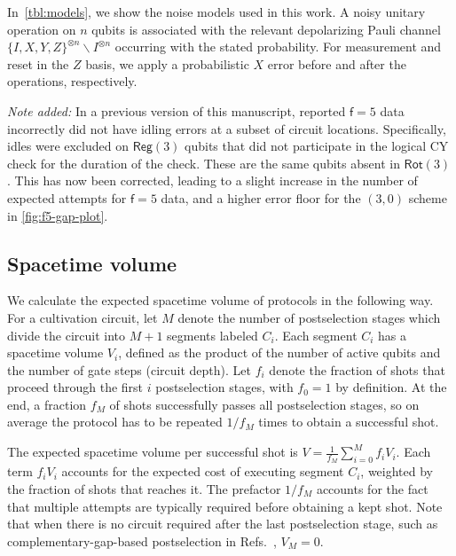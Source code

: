 \documentclass[%
    aps, 
    physrev,
    reprint,
]{revtex4-2}
\newcommand{\fd}[1]{\mathsf{f}=#1}
\newcommand{\rot}[1]{\mathsf{Rot}(#1)}
\newcommand{\reg}[1]{\mathsf{Reg}(#1)}
\begin{document}
In~\cref{tbl:models}, we show the noise models used in this work. 
A noisy unitary operation on $n$ qubits is associated with the relevant depolarizing Pauli channel $\{I,X,Y,Z\}^{\otimes n} \backslash I^{\otimes n}$ occurring with the stated probability. 
For measurement and reset in the $Z$ basis, we apply a probabilistic $X$ error before and after the operations, respectively.

\textit{Note added:} In a previous version of this manuscript, reported $\fd{5}$ data incorrectly did not have idling errors at a subset of circuit locations. Specifically, idles were excluded on $\reg{3}$ qubits that did not participate in the logical CY check for the duration of the check. These are the same qubits absent in $\rot{3}$. This has now been corrected, leading to a slight increase in the number of expected attempts for $\fd{5}$ data, and a higher error floor for the $(3,0)$ scheme in \cref{fig:f5-gap-plot}.

\subsection{Spacetime volume} \label{app:spacetime volume}

We calculate the expected spacetime volume of protocols in the following way.
For a cultivation circuit, let $M$ denote the number of postselection stages which divide the circuit into $M+1$ segments labeled $C_i$.
Each segment $C_i$ has a spacetime volume $V_i$, defined as the product of the number of active qubits and the number of gate steps (circuit depth). 
Let $f_i$ denote the fraction of shots that proceed through the first $i$ postselection stages, with $f_0=1$ by definition. At the end, a fraction $f_M$ of shots successfully passes all postselection stages, so on average the protocol has to be repeated $1/f_M$ times to obtain a successful shot. 

The expected spacetime volume per successful shot is
$V = \frac{1}{f_M} \sum_{i=0}^M f_i V_i$.
Each term $f_i V_i$ accounts for the expected cost of executing segment $C_i$, weighted by the fraction of shots that reaches it. 
The prefactor $1/f_M$ accounts for the fact that multiple attempts are typically required before obtaining a kept shot. 
Note that when there is no circuit required after the last postselection stage, such as complementary-gap-based postselection in Refs.~\cite{gidney2024magic, chen2025efficient, claes2025cultivatingtstatessurface, vaknin2025magic}, $V_M=0$. 
\end{document}
